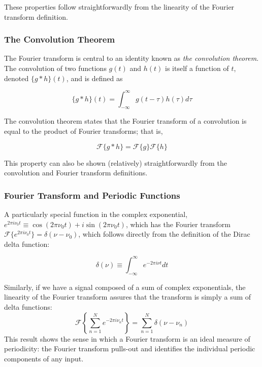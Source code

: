 \documentclass[preprint]{aastex}
\begin{document}
These properties follow straightforwardly from the linearity of the Fourier transform definition.

\subsubsection{The Convolution Theorem}

The Fourier transform is central to an identity known as {\it the convolution theorem}.
The convolution of two functions $g(t)$ and $h(t)$ is itself a function of $t$, denoted $\{g \ast h\}(t)$, and is defined as

\begin{equation}
  \{g \ast h\}(t) = \int_{-\infty}^\infty g(t - \tau) h(\tau) d\tau
\end{equation}

The convolution theorem states that the Fourier transform of a convolution is equal to the product of Fourier transforms; that is,

\begin{equation}
  \mathcal{F}\{g \ast h\} = \mathcal{F}\{g\}\mathcal{F}\{h\}
\end{equation}

This property can also be shown (relatively) straightforwardly from the convolution and Fourier transform definitions.

\subsubsection{Fourier Transform and Periodic Functions}

A particularly special function in the complex exponential, $e^{2\pi i\nu_0 t} \equiv \cos(2\pi \nu_0 t) + i\sin(2\pi\nu_0 t)$, which has the Fourier transform $\mathcal{F}\{e^{2\pi i\nu_0 t}\} = \delta(\nu - \nu_0)$, which follows directly from the definition of the Dirac delta function:

\begin{equation}
  \delta(\nu) \equiv \int_{-\infty}^\infty e^{-2\pi i\nu t}dt
\end{equation}

Similarly, if we have a signal composed of a sum of complex exponentials, the linearity of the Fourier transform assures that the transform is simply a sum of delta functions:
\begin{equation}
  \mathcal{F}\left\{ \sum_{n=1}^N e^{-2\pi i \nu_n t} \right\} = \sum_{n=1}^N \delta(\nu - \nu_n)
\end{equation}
This result shows the sense in which a Fourier transform is an ideal measure of periodicity: the Fourier transform pulls-out and identifies the individual periodic components of any input.
\end{document}
